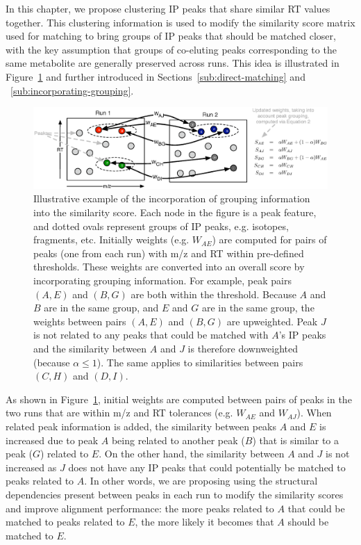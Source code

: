 In this chapter, we propose clustering IP peaks that share similar RT values together. This clustering information is used to modify the similarity score matrix used for matching to bring groups of IP peaks that should be matched closer, with the key assumption that groups of co-eluting peaks corresponding to the same metabolite are generally preserved across runs. This idea is illustrated in Figure~\ref{fig:computingweight} and further introduced in Sections~\ref{sub:direct-matching} and ~\ref{sub:incorporating-grouping}.  

\begin{figure}[!htbp]
\centering\includegraphics[width=1\linewidth]{04-matching/figures/figure_1.eps}
\centering\caption[Illustrative example of the incorporation of grouping information into the similarity score.]{\label{fig:computingweight} Illustrative example of the incorporation of grouping information into the similarity score. Each node in the figure is a peak feature, and dotted ovals represent groups of IP peaks, e.g. isotopes, fragments, etc. Initially weights (e.g. $W_{AE}$) are computed for pairs of peaks (one from each run) with m/z and RT within pre-defined thresholds. These weights are converted into an overall score by incorporating grouping information. For example, peak pairs $(A,E)$ and $(B,G)$ are both within the threshold. Because $A$ and $B$ are in the same group, and $E$ and $G$ are in the same group, the weights between pairs $(A,E)$ and $(B,G)$ are upweighted. Peak $J$ is not related to any peaks that could be matched with $A$'s IP peaks and the similarity between $A$ and $J$ is therefore downweighted (because $\alpha\leq 1$). The same applies to similarities between pairs $(C,H)$ and $(D,I)$.}
\end{figure}

As shown in Figure~\ref{fig:computingweight}, initial weights are computed between pairs of peaks in the two runs that are within m/z and RT tolerances (e.g. $W_{AE}$ and $W_{AJ}$). When related peak information is added, the similarity between peaks $A$ and $E$ is increased due to peak $A$ being related to another peak ($B$) that is similar to a peak ($G$) related to $E$. On the other hand, the similarity between $A$ and $J$ is not increased as $J$ does not have any IP peaks that could potentially be matched to peaks related to $A$. In other words, we are proposing using the structural dependencies present between peaks in each run to modify the similarity scores and improve alignment performance: the more peaks related to $A$ that could be matched to peaks related to $E$, the more likely it becomes that $A$ should be matched to $E$.

